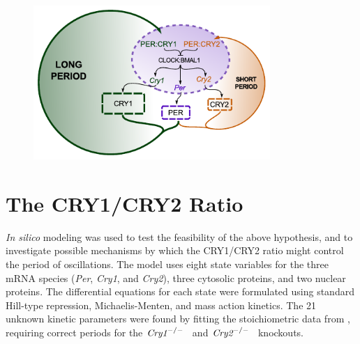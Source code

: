 \begin{figure}[bt]
  \centering
  \begin{minipage}{0.8\textwidth}
    \centering
    \includegraphics[width=0.8\textwidth]{chap2/figures/twoloops_noopacity.pdf}
     \label{fig:twoloops}
  \end{minipage}
\end{figure}

\section{The CRY1/CRY2 Ratio}
{\it In silico} modeling was used to test the feasibility of the above hypothesis, and to investigate possible mechanisms by which the CRY1/CRY2 ratio might control the period of oscillations. The model uses eight state variables for the three mRNA species ({\it Per}, {\it Cry1}, and {\it Cry2}), three cytosolic proteins, and two nuclear proteins. The differential equations for each state were formulated using standard Hill-type repression, Michaelis-Menten, and mass action kinetics. The 21 unknown kinetic parameters were found by fitting the stoichiometric data from \cite{Lee2001}, requiring correct periods for the $\text{\it Cry1}^{-/-}$  and $\text{\it Cry2}^{-/-}$  knockouts.

